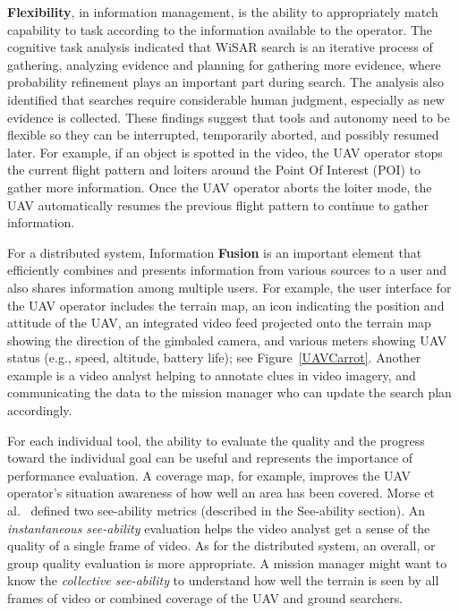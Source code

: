 \textbf{Flexibility}, in information management, is the ability to appropriately match capability to task according to the information available to the operator.
The cognitive task analysis indicated that WiSAR search is an iterative process of gathering, analyzing evidence and planning for gathering more evidence, where probability refinement plays an important part during search. The analysis also identified that searches require considerable human judgment, especially as new evidence is collected. These findings suggest that tools and autonomy need to be flexible so they can be interrupted, temporarily aborted, and possibly resumed later. For example, if an object is spotted in the video, the UAV operator stops the current flight pattern and loiters around the Point Of Interest (POI) to gather more information. Once the UAV operator aborts the loiter mode, the UAV automatically resumes the previous flight pattern to continue to gather information.

For a distributed system, Information \textbf{Fusion} is an important element that efficiently combines and presents information from various sources to a user and also shares information among multiple users. For example, the user interface for the UAV operator includes the terrain map, an icon indicating the position and attitude of the UAV, an integrated video feed projected onto the terrain map showing the direction of the gimbaled camera, and various meters showing UAV status (e.g., speed, altitude, battery life); see Figure~\ref{UAVCarrot}. Another example is a video analyst helping to annotate clues in video imagery, and communicating the data to the mission manager who can update the search plan accordingly.

For each individual tool, the ability to evaluate the quality and the progress toward the individual goal can be useful and represents the importance of performance evaluation. A coverage map, for example, improves the UAV operator's situation awareness of how well an area has been covered. Morse et al.~\cite{Morse2010UAV} defined two see-ability metrics (described in the See-ability section). An \textit{instantaneous see-ability} evaluation helps the video analyst get a sense of the quality of a single frame of video. As for the distributed system, an overall, or group quality evaluation is more appropriate. A mission manager might want to know the \textit{collective see-ability} to understand how well the terrain is seen by all frames of video or combined coverage of the UAV and ground searchers.

